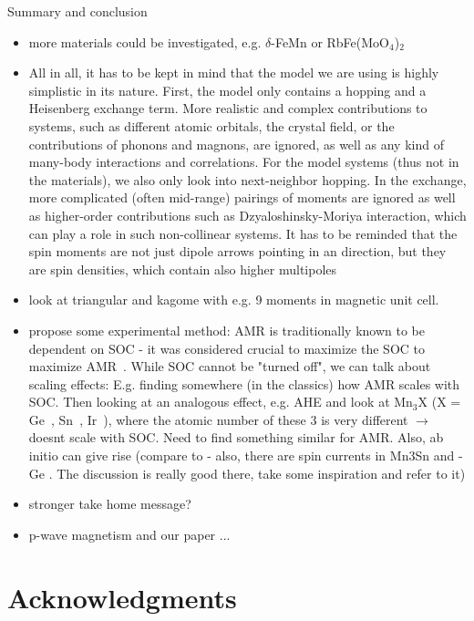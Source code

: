 \documentclass[prb,showpacs,amsmath,amssymb,superscriptaddress,twocolumn,floatfix]{revtex4-1}
\begin{document}
Summary and conclusion

\begin{itemize}
	\item more materials could be investigated, e.g. $\delta$-FeMn
	or RbFe(MoO$_4$)$_2$
	\item All in all, it has to be kept in mind that the model we are using is highly simplistic in its nature. First, the model only contains a hopping and a Heisenberg exchange term. More realistic and complex contributions to systems, such as different atomic orbitals, the crystal field, or the contributions of phonons and magnons, are ignored, as well as any kind of many-body interactions and correlations. For the model systems (thus not in the materials), we also only look into next-neighbor hopping. In the exchange, more complicated (often mid-range) pairings of moments are ignored as well as higher-order contributions such as Dzyaloshinsky-Moriya interaction, which can play a role in such non-collinear systems. It has to be reminded that the spin moments are not just dipole arrows pointing in an direction, but they are spin densities, which contain also higher multipoles
	\item look at triangular and kagome with e.g. 9 moments in magnetic unit cell. 
	\item propose some experimental method: AMR is traditionally known to be dependent on SOC - it was considered crucial to maximize the SOC to maximize AMR~\cite{Ritzinger:2023}. While SOC cannot be "turned off", we can talk about scaling effects: E.g. finding somewhere (in the classics) how AMR scales with SOC. Then looking at an analogous effect, e.g. AHE and look at Mn$_3$X (X = Ge~\cite{Kiyohara:2016}, Sn~\cite{Nakatsuji:2015}, Ir~\cite{Iwaki:2020}), where the atomic number of these 3 is very different $\rightarrow$ doesnt scale with SOC. Need to find something similar for AMR. Also, ab initio can give rise (compare to \cite{Gonzalez-Hernandez:2024} - also, there are spin currents in Mn3Sn and -Ge \cite{Zelezny:2017}. The discussion is really good there, take some inspiration and refer to it)
	
	\item stronger take home message?
	\item p-wave magnetism and our paper ... 
\end{itemize}


\section*{Acknowledgments}
\end{document}
